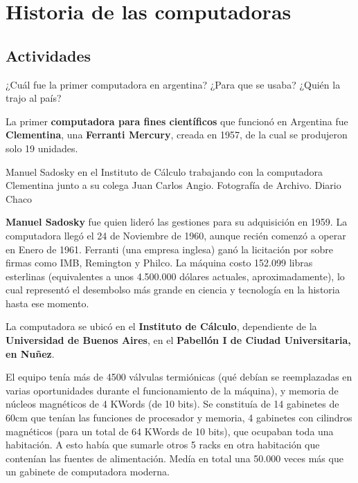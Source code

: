 
\chapter{Historia de las computadoras}

\setcounter{section}{4}
\section{Actividades}

\begin{exercise}
¿Cuál fue la primer computadora en argentina? ¿Para que se usaba? ¿Quién la
trajo al país?
\end{exercise}

La primer \textbf{computadora para fines científicos} que funcionó en Argentina
fue \textbf{Clementina}, una \textbf{Ferranti Mercury}, creada en 1957, de la
cual se produjeron solo 19 unidades.

{Manuel Sadosky en el Instituto de Cálculo trabajando con la computadora
Clementina junto a su colega Juan Carlos Angio.} {Fotografía de Archivo. Diario
Chaco}

\textbf{Manuel Sadosky} fue quien lideró las gestiones para su adquisición en
1959. La computadora llegó el 24 de Noviembre de 1960, aunque recién comenzó a
operar en Enero de 1961. Ferranti (una empresa inglesa) ganó la licitación por
sobre firmas como IMB, Remington y Philco. La máquina costo 152.099 libras
esterlinas (equivalentes a unos 4.500.000 dólares actuales, aproximadamente), lo
cual representó el desembolso más grande en ciencia y tecnología en la historia
hasta ese momento.

La computadora se ubicó en el \textbf{Instituto de Cálculo}, dependiente de la
\textbf{Universidad de Buenos Aires}, en el \textbf{Pabellón I de Ciudad
Universitaria, en Nuñez}.

El equipo tenía más de 4500 válvulas termiónicas (qué debían se reemplazadas en
varias oportunidades durante el funcionamiento de la máquina), y memoria de
núcleos magnéticos de 4 KWords (de 10 bits). Se constituía de 14 gabinetes de
60cm que tenían las funciones de procesador y memoria, 4 gabinetes con cilindros
magnéticos (para un total de 64 KWords de 10 bits), que ocupaban toda una
habitación. A esto había que sumarle otros 5 racks en otra habitación que
contenían las fuentes de alimentación. Medía en total una 50.000 veces más que
un gabinete de computadora moderna.

